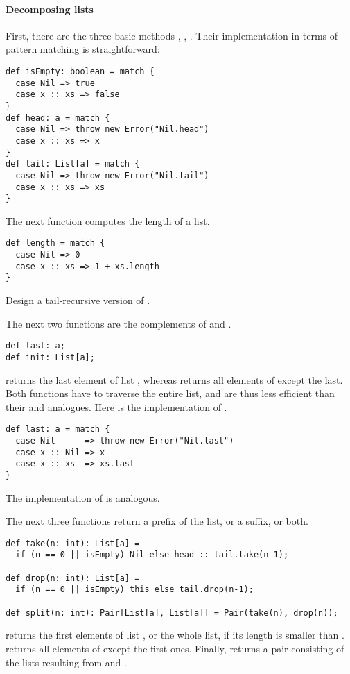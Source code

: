 \paragraph{Decomposing lists}
First, there are the three basic methods ,
, . Their implementation in terms of pattern
matching is straightforward:
\begin{lstlisting}
def isEmpty: boolean = match {
  case Nil => true
  case x :: xs => false
}
def head: a = match {
  case Nil => throw new Error("Nil.head")
  case x :: xs => x
}
def tail: List[a] = match {
  case Nil => throw new Error("Nil.tail")
  case x :: xs => xs
}
\end{lstlisting}

The next function computes the length of a list.
\begin{lstlisting}
def length = match {
  case Nil => 0
  case x :: xs => 1 + xs.length
}
\end{lstlisting}
\begin{exercise} Design a tail-recursive version of .
\end{exercise}

The next two functions are the complements of  and
.
\begin{lstlisting}
def last: a;
def init: List[a];
\end{lstlisting}
 returns the last element of list , whereas
 returns all elements of  except the last.
Both functions have to traverse the entire list, and are thus less
efficient than their  and  analogues.
Here is the implementation of .
\begin{lstlisting}
def last: a = match {
  case Nil      => throw new Error("Nil.last")
  case x :: Nil => x
  case x :: xs  => xs.last
}
\end{lstlisting}
The implementation of  is analogous.

The next three functions return a prefix of the list, or a suffix, or
both.
\begin{lstlisting}
def take(n: int): List[a] = 
  if (n == 0 || isEmpty) Nil else head :: tail.take(n-1);

def drop(n: int): List[a] = 
  if (n == 0 || isEmpty) this else tail.drop(n-1);

def split(n: int): Pair[List[a], List[a]] = Pair(take(n), drop(n));
\end{lstlisting}
 returns the first  elements of list
, or the whole list, if its length is smaller than .
 returns all elements of  except the
 first ones. Finally,  returns a pair
consisting of the lists resulting from  and
.

